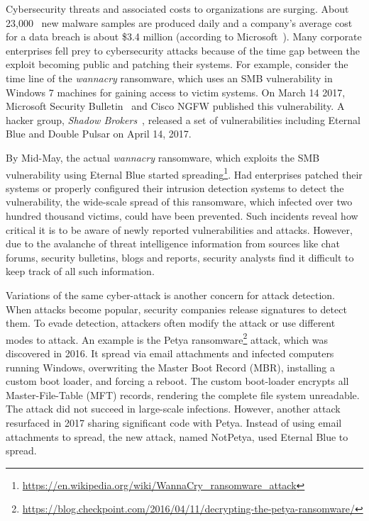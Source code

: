 Cybersecurity threats and associated costs to organizations are surging. About 23,000~\cite{pandasecurity} new malware samples are produced daily and a company's average cost for a data breach is about \$3.4 million (according to Microsoft~\cite{thebestvpn}). 
Many corporate enterprises fell prey to cybersecurity attacks because of the time gap between the exploit becoming public and patching their systems. For example, consider the time line of the \textit{wannacry} ransomware, which uses an SMB vulnerability in Windows 7 machines for gaining access to victim systems. On March 14 2017, Microsoft Security Bulletin~\cite{ms017bulletin} and Cisco NGFW published this vulnerability. A hacker group, \textit{Shadow Brokers}~\cite{ciscowannacry}, released a set of vulnerabilities including Eternal Blue and Double Pulsar on April 14, 2017.

By Mid-May, the actual \textit{wannacry} ransomware, which exploits the SMB vulnerability using Eternal Blue started spreading\footnote{\url{https://en.wikipedia.org/wiki/WannaCry_ransomware_attack}}. Had enterprises patched their systems or properly configured their intrusion detection systems to detect the vulnerability, the wide-scale spread of this ransomware, which infected over two hundred thousand victims, could have been prevented. Such incidents reveal how critical it is to be aware of newly reported vulnerabilities and attacks. However, due to the avalanche of threat intelligence information from sources like chat forums, security bulletins, blogs and reports, security analysts find it difficult to keep track of all such information. 

Variations of the same cyber-attack is another concern for attack detection. When attacks become popular, security companies release signatures to detect them. To evade detection, attackers often modify the attack or use different modes to attack. An example is the Petya ransomware\footnote{\url{https://blog.checkpoint.com/2016/04/11/decrypting-the-petya-ransomware/}} attack, which was discovered in 2016. It spread via email attachments and infected computers running Windows, overwriting the Master Boot Record (MBR), installing a custom boot loader, and forcing a reboot. The custom boot-loader encrypts all Master-File-Table (MFT) records, rendering the complete file system unreadable. The attack did not succeed in large-scale infections. However, another attack resurfaced in 2017 sharing significant code with Petya. Instead of using email attachments to spread, the new attack, named NotPetya, used Eternal Blue to spread. %

